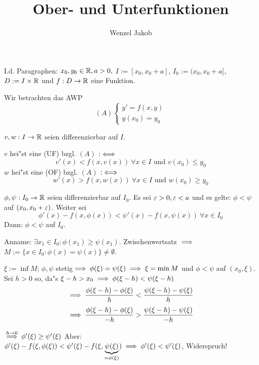 \documentclass{article}
\title{Ober- und Unterfunktionen}
\author{Wenzel Jakob}
\begin{document}
\maketitle

\begin{vereinbarung}
I.d. Paragraphen: $x_0, y_0\in\mathbb{R}, a>0,$ \mbox{$I:=[x_0, x_0+a]$}, \mbox{$I_0:=(x_0, x_0+a]$}, 
$D:=I\times \mathbb{R}$ und $f:D\to\mathbb{R}$ eine Funktion.
\end{vereinbarung}

Wir betrachten das AWP
\[
	(A)\begin{cases}
		y'=f(x,y)\\
		y(x_0)=y_0
	\end{cases}
\]

\begin{definition}
$v,w:I\to\mathbb{R}$ seien differenzierbar auf $I$.

$v$ hei"st eine  (UF) bzgl. $(A)$ $:\iff$
\[
	v'(x)<f(x,v(x))\ \forall x\in I\text{ und }v(x_0)\le y_0
\]
$w$ hei"st eine  (OF) bzgl. $(A)$ $:\iff$
\[
	w'(x)>f(x,w(x))\ \forall x\in I\text{ und }w(x_0)\ge y_0
\]
\end{definition}

\begin{wichtigerhilfssatz}
$\phi,\psi:I_0\to\mathbb{R}$ seien differenzierbar auf $I_0$. Es sei $\varepsilon>0,\varepsilon<a$ und es gelte: $\phi<\psi$ auf $(x_0, x_0+\varepsilon)$.
Weiter sei
\[
	\phi'(x)-f(x,\phi(x)) < \psi'(x)-f(x,\psi(x))\ \forall x\in I_0
\]
Dann: $\phi<\psi$ auf $I_0$.
\end{wichtigerhilfssatz}
\begin{beweis}
Anname: $\exists x_1\in I_0: \phi(x_1)\ge \psi(x_1)$.
Zwischenwertsatz $\implies$ \mbox{$M:=\{x\in I_0: \phi(x)=\psi(x)\}\ne\emptyset$.}

$\xi:=\inf M$; $\phi,\psi$ stetig$\implies \phi(\xi)=\psi(\xi)\implies\xi=\min M$ und $\phi<\psi$ auf $(x_0,\xi)$.
Sei $h>0$ so, da"s $\xi-h>x_0\implies\phi(\xi-h)<\psi(\xi-h)$
\[
	\implies
	\frac{\phi(\xi-h)-\phi(\xi)}{h}<\frac{\psi(\xi-h)-\psi(\xi)}{h}
\]
\[
	\implies 
	\frac{\phi(\xi-h)-\phi(\xi)}{-h}>\frac{\psi(\xi-h)-\psi(\xi)}{-h}
\]

$\overset{h\to 0}{\implies} \phi'(\xi)\ge\psi'(\xi)$
Aber: $\phi'(\xi)-f(\xi,\phi(\xi)) < \psi'(\xi)-f(\xi,\underbrace{\psi(\xi)}_{=\phi(\xi)})
\implies \phi'(\xi)<\psi'(\xi)$, Widerspruch!
\end{beweis}
\end{document}
